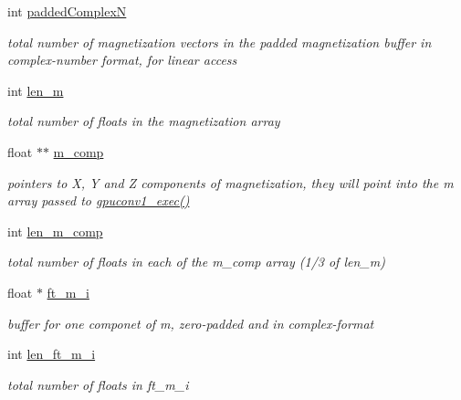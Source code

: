 \begin{DoxyCompactItemize}
int \hyperlink{structgpuconv1_ae7087efad8a8759e05ba5b24be745155}{paddedComplexN}
\begin{DoxyCompactList}\small\item\em total number of magnetization vectors in the padded magnetization buffer in complex-\/number format, for linear access \item\end{DoxyCompactList}\item 
int \hyperlink{structgpuconv1_ae27934e56185491eac926153abc81d53}{len\_\-m}
\begin{DoxyCompactList}\small\item\em total number of floats in the magnetization array \item\end{DoxyCompactList}\item 
float $\ast$$\ast$ \hyperlink{structgpuconv1_a4d2d201f61019be9026134f0a08a15b5}{m\_\-comp}
\begin{DoxyCompactList}\small\item\em pointers to X, Y and Z components of magnetization, they will point into the m array passed to \hyperlink{gpuconv1_8h_a290a0200b1639a156c1767f74bf5b94e}{gpuconv1\_\-exec()} \item\end{DoxyCompactList}\item 
int \hyperlink{structgpuconv1_a75c95abdb09599057d8f79398410f6f4}{len\_\-m\_\-comp}
\begin{DoxyCompactList}\small\item\em total number of floats in each of the m\_\-comp array (1/3 of len\_\-m) \item\end{DoxyCompactList}\item 
float $\ast$ \hyperlink{structgpuconv1_a8fb89a2ea5777cad81dc9bc2701eed2a}{ft\_\-m\_\-i}
\begin{DoxyCompactList}\small\item\em buffer for one componet of m, zero-\/padded and in complex-\/format \item\end{DoxyCompactList}\item 
int \hyperlink{structgpuconv1_aa277feb9a1878f2b6f8f6e32b54473b1}{len\_\-ft\_\-m\_\-i}
\begin{DoxyCompactList}\small\item\em total number of floats in ft\_\-m\_\-i \item\end{DoxyCompactList}\item 
$$
\end{DoxyCompactItemize}
